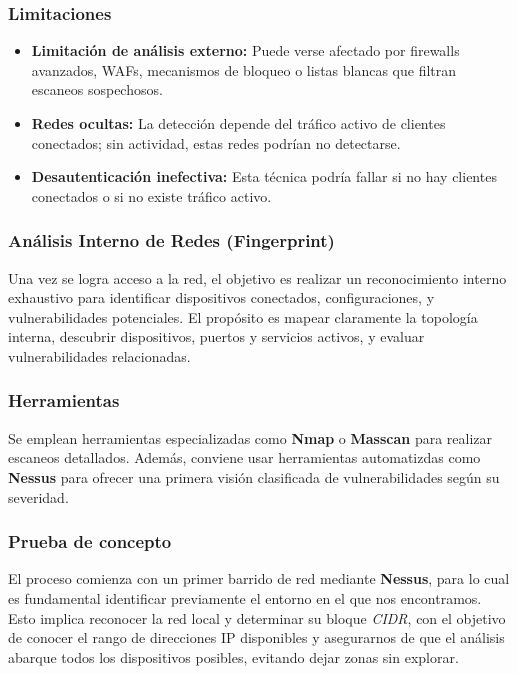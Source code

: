 \documentclass[a4paper, 11pt]{article}
\begin{document}
\subsubsection*{Limitaciones}

\begin{itemize}
    \item \textbf{Limitación de análisis externo:} Puede verse afectado por firewalls avanzados, WAFs, mecanismos de bloqueo o listas blancas que filtran escaneos sospechosos.
    
    \item \textbf{Redes ocultas:} La detección depende del tráfico activo de clientes conectados; sin actividad, estas redes podrían no detectarse.
    
    \item \textbf{Desautenticación inefectiva:} Esta técnica podría fallar si no hay clientes conectados o si no existe tráfico activo.
\end{itemize}


\subsubsection{Análisis Interno de Redes (Fingerprint)}

Una vez se logra acceso a la red, el objetivo es realizar un reconocimiento interno exhaustivo para identificar dispositivos conectados, configuraciones, y vulnerabilidades potenciales. El propósito es mapear claramente la topología interna, descubrir dispositivos, puertos y servicios activos, y evaluar vulnerabilidades relacionadas.


\subsubsection*{Herramientas}
Se emplean herramientas especializadas como \textbf{Nmap} o \textbf{Masscan} para realizar escaneos detallados. Además, conviene usar 
herramientas automatizdas como \textbf{Nessus} para ofrecer una primera visión clasificada de vulnerabilidades según su severidad.


\subsubsection*{Prueba de concepto}
El proceso comienza con un primer barrido de red mediante \textbf{Nessus}, para lo cual es fundamental identificar previamente el entorno en el que nos encontramos. Esto implica reconocer la red local y determinar su bloque \textit{CIDR}, con el objetivo de conocer el rango de direcciones IP disponibles y asegurarnos de que el análisis abarque todos los dispositivos posibles, evitando dejar zonas sin explorar.
\end{document}
